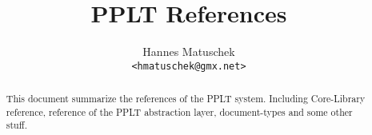 \documentclass{manual}
\title{PPLT References}
\author{Hannes Matuschek\\\texttt{<hmatuschek@gmx.net>}}
\begin{document}
   
    \maketitle
    \begin{abstract}
    This document summarize the references of the PPLT system. Including Core-Library reference, reference
    of the PPLT abstraction layer, document-types and some other stuff.
    \end{abstract}

    \tableofcontents


    
    
    
    
    
%    
    
    
    
    
 
\end{document}
